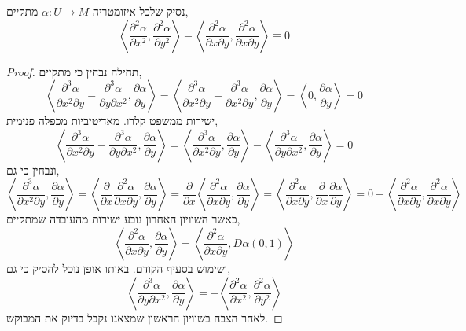 \subquestion{}
נסיק שלכל איזומטריה $\alpha : U \to M$ מתקיים,
\[
	\left\langle \frac{\partial^2 \alpha}{\partial x^2}, \frac{\partial^2 \alpha}{\partial y^2} \right\rangle
	- \left\langle \frac{\partial^2 \alpha}{\partial x \partial y}, \frac{\partial^2 \alpha}{\partial x \partial y} \right\rangle
	\equiv 0
\]
\begin{proof}
	תחילה נבחין כי מתקיים,
	\[
		\left\langle \frac{\partial^3 \alpha}{\partial x^2 \partial y} - \frac{\partial^3 \alpha}{\partial y \partial x^2}, \frac{\partial \alpha}{\partial y} \right\rangle
		= \left\langle \frac{\partial^3 \alpha}{\partial x^2 \partial y} - \frac{\partial^3 \alpha}{\partial x^2 \partial y}, \frac{\partial \alpha}{\partial y} \right\rangle
		= \left\langle 0, \frac{\partial \alpha}{\partial y} \right\rangle
		= 0
	\]
	ישירות ממשפט קלרו.
	מאדיטיביות מכפלה פנימית,
	\[
		\left\langle \frac{\partial^3 \alpha}{\partial x^2 \partial y} - \frac{\partial^3 \alpha}{\partial y \partial x^2}, \frac{\partial \alpha}{\partial y} \right\rangle
		= \left\langle \frac{\partial^3 \alpha}{\partial x^2 \partial y}, \frac{\partial \alpha}{\partial y} \right\rangle
		- \left\langle\frac{\partial^3 \alpha}{\partial y \partial x^2}, \frac{\partial \alpha}{\partial y} \right\rangle
		= 0
	\]
	ונבחין כי גם,
	\[
		\left\langle \frac{\partial^3 \alpha}{\partial x^2 \partial y}, \frac{\partial \alpha}{\partial y} \right\rangle
		= \left\langle \frac{\partial}{\partial x} \frac{\partial^2 \alpha}{\partial x \partial y}, \frac{\partial \alpha}{\partial y} \right\rangle
		= \frac{\partial}{\partial x} \left\langle \frac{\partial^2 \alpha}{\partial x \partial y}, \frac{\partial \alpha}{\partial y} \right\rangle
		= \left\langle \frac{\partial^2 \alpha}{\partial x \partial y}, \frac{\partial}{\partial x} \frac{\partial \alpha}{\partial y} \right\rangle
		= 0 - \left\langle \frac{\partial^2 \alpha}{\partial x \partial y}, \frac{\partial^2 \alpha}{\partial x \partial y} \right\rangle
	\]
	כאשר השוויון האחרון נובע ישירות מהעובדה שמתקיים,
	\[
		\left\langle \frac{\partial^2 \alpha}{\partial x \partial y}, \frac{\partial \alpha}{\partial y} \right\rangle
		= \left\langle \frac{\partial^2 \alpha}{\partial x \partial y}, D \alpha(0, 1) \right\rangle
	\]
	ושימוש בסעיף הקודם.
	באותו אופן נוכל להסיק כי גם,
	\[
		\left\langle\frac{\partial^3 \alpha}{\partial y \partial x^2}, \frac{\partial \alpha}{\partial y} \right\rangle
		= - \left\langle\frac{\partial^2 \alpha}{\partial x^2}, \frac{\partial^2 \alpha}{\partial y^2} \right\rangle
	\]
	לאחר הצבה בשוויון הראשון שמצאנו נקבל בדיוק את המבוקש.
\end{proof}



